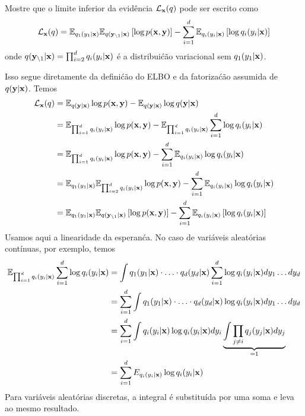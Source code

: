 \begin{exenumerate}
    \item Mostre que o limite inferior da evid\^encia $\mathcal{L}_{\mathbf{x}}(q)$ pode ser escrito como
    \begin{equation}
        \mathcal{L}_{\mathbf{x}}(q) = \mathbb{E}_{q_1(y_1|\mathbf{x})} \mathbb{E}_{q(\mathbf{y}_{\setminus 1}|\mathbf{x})}\left[ \log p(\mathbf{x},\mathbf{y})\right] - \sum_{i=1}^d \mathbb{E}_{q_i(y_i|\mathbf{x})} \left[\log q_i(y_i|\mathbf{x})\right]
    \end{equation}
    onde $q(\mathbf{y}_{\setminus 1}|\mathbf{x}) = \prod_{i=2}^d q_i(y_i | \mathbf{x})$ \'e a distribui\'c\~ao variacional sem $q_1(y_1|\mathbf{x})$.
    
    \begin{solution}
        Isso segue diretamente da defini\'c\~ao do ELBO e da fatoriza\'c\~ao assumida de $q(\mathbf{y}|\mathbf{x})$. Temos
        \begin{align}
            \mathcal{L}_{\mathbf{x}}(q) &= \mathbb{E}_{q(\mathbf{y}|\mathbf{x})} \log p(\mathbf{x},\mathbf{y}) - \mathbb{E}_{q(\mathbf{y}|\mathbf{x})} \log q(\mathbf{y}|\mathbf{x}) \\
            & = \mathbb{E}_{ \prod_{i=1}^d q_i(y_i | \mathbf{x})}  \log p(\mathbf{x},\mathbf{y}) - \mathbb{E}_{ \prod_{i=1}^d q_i(y_i | \mathbf{x})} \sum_{i=1}^d \log q_i(y_i|\mathbf{x}) \\
            & = \mathbb{E}_{ \prod_{i=1}^d q_i(y_i | \mathbf{x})}  \log p(\mathbf{x},\mathbf{y}) - \sum_{i=1}^d  \mathbb{E}_{q_i(y_i | \mathbf{x})} \log q_i(y_i|\mathbf{x}) \\
            & = \mathbb{E}_{q_1(y_1|\mathbf{x})} \mathbb{E}_{ \prod_{i=2}^d q_i(y_i | \mathbf{x})}  \log p(\mathbf{x},\mathbf{y}) - \sum_{i=1}^d  \mathbb{E}_{q_i(y_i | \mathbf{x})} \log q_i(y_i|\mathbf{x})\\
            & = \mathbb{E}_{q_1(y_1|\mathbf{x})} \mathbb{E}_{q(\mathbf{y}_{\setminus 1}|\mathbf{x})}\left[ \log p(\mathbf{x},\mathbf{y})\right] - \sum_{i=1}^d \mathbb{E}_{q_i(y_i|\mathbf{x})} \left[\log q_i(y_i|\mathbf{x})\right]
        \end{align}
        Usamos aqui a linearidade da esperan\'ca. No caso de vari\'aveis aleat\'orias cont\'inuas, por exemplo, temos
        \begin{align}
            \mathbb{E}_{ \prod_{i=1}^d q_i(y_i | \mathbf{x})} \sum_{i=1}^d \log q_i(y_i|\mathbf{x}) & = \int  q_1(y_1 | \mathbf{x})\cdot \ldots\cdot q_d(y_d|\mathbf{x})  \sum_{i=1}^d \log q_i(y_i|\mathbf{x}) d y_1\ldots d y_d\\
            & =  \sum_{i=1}^d \int q_1(y_1 | \mathbf{x})\cdot \ldots \cdot q_d(y_d|\mathbf{x}) \log q_i(y_i|\mathbf{x}) d y_1\ldots d y_d\\
            & =  \sum_{i=1}^d \int q_i(y_i | \mathbf{x})\log q_i(y_i|\mathbf{x}) d y_i \underbrace{\int \prod_{j\neq i} q_j(y_j|\mathbf{x}) d y_j}_{=1}\\
            & =  \sum_{i=1}^d E_{q_i(y_i|\mathbf{x})} \log q_i(y_i|\mathbf{x})
        \end{align}
        Para vari\'aveis aleat\'orias discretas, a integral \'e substitu\'ida por uma soma e leva ao mesmo resultado.
        

\end{solution}
\end{exenumerate}
